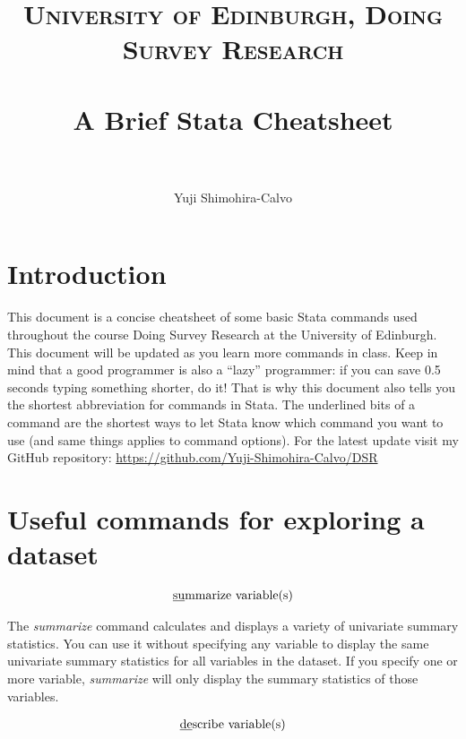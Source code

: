 \documentclass[paper=a4, fontsize=11pt]{scrartcl} %
\title{	
\normalfont \normalsize 
\textsc{University of Edinburgh, Doing Survey Research} \\ [25pt] %
\horrule{0.5pt} \\[0.4cm] %
\huge A Brief Stata Cheatsheet \\ %
\horrule{2pt} \\[0.5cm] %
}
\author{Yuji Shimohira-Calvo} %
\date{\normalsize\the\year} %
\numberwithin{equation}{section} %
\numberwithin{figure}{section} %
\numberwithin{table}{section} %
\begin{document}
\maketitle %


\section*{Introduction}

This document is a concise cheatsheet of some basic Stata commands used throughout the course Doing Survey Research at the University of Edinburgh. This document will be updated as you learn more commands in class. Keep in mind that a good programmer is also a ``lazy'' programmer: if you can save 0.5 seconds typing something shorter, do it! That is why this document also tells you the shortest abbreviation for commands in Stata. The underlined bits of a command are the shortest ways to let Stata know which command you want to use (and same things applies to command options). For the latest update visit my GitHub repository: \url{https://github.com/Yuji-Shimohira-Calvo/DSR}  


\section{Useful commands for exploring a dataset}

\begin{align} 
\text{\underline{su}mmarize variable(s)}
\end{align}

The \textit{summarize} command calculates and displays a variety of univariate summary statistics. You can use it without specifying any variable to display the same univariate summary statistics for all variables in the dataset. If you specify one or more variable, \textit{summarize} will only display the summary statistics of those variables.

\begin{align}
	\text{\underline{de}scribe variable(s)}
\end{align}
\end{document}
